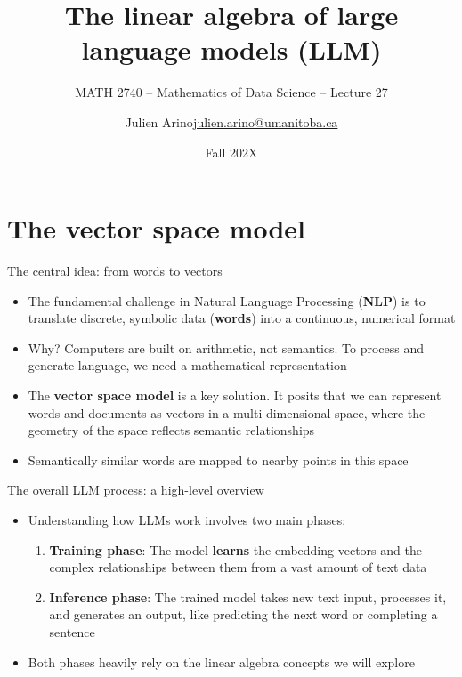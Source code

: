 \documentclass[aspectratio=169]{beamer}\usepackage[]{graphicx}\usepackage[]{xcolor}
\subtitle{MATH 2740 -- Mathematics of Data Science -- Lecture 27}
\author{\texorpdfstring{Julien Arino\newline\url{julien.arino@umanitoba.ca}}{Julien Arino}}
\institute{Department of Mathematics @ University of Manitoba}
\date{Fall 202X}
\title{The linear algebra of large language models (LLM)}
\makeatletter
\newcommand{\defword}[1]{\textbf{\textcolor{beamer@blendedblue}{#1}}}
\makeatother
\begin{document}

\section{The vector space model}

\begin{frame}{The central idea: from words to vectors}
\begin{itemize}
\item The fundamental challenge in Natural Language Processing (\defword{NLP}) is to translate discrete, symbolic data (\defword{words}) into a continuous, numerical format
\vfill
\item Why? Computers are built on arithmetic, not semantics. To process and generate language, we need a mathematical representation
\vfill
\item The \defword{vector space model} is a key solution. It posits that we can represent words and documents as vectors in a multi-dimensional space, where the geometry of the space reflects semantic relationships
\vfill
\item Semantically similar words are mapped to nearby points in this space
\end{itemize}
\end{frame}

\begin{frame}{The overall LLM process: a high-level overview}
\begin{itemize}
    \item Understanding how LLMs work involves two main phases:
    \vfill
    \begin{enumerate}
        \item \textbf{Training phase}: The model \textbf{learns} the embedding vectors and the complex relationships between them from a vast amount of text data
        \vfill
        \item \textbf{Inference phase}: The trained model takes new text input, processes it, and generates an output, like predicting the next word or completing a sentence
    \end{enumerate}
    \vfill
    \item Both phases heavily rely on the linear algebra concepts we will explore
\end{itemize}
\end{frame}
\end{document}
